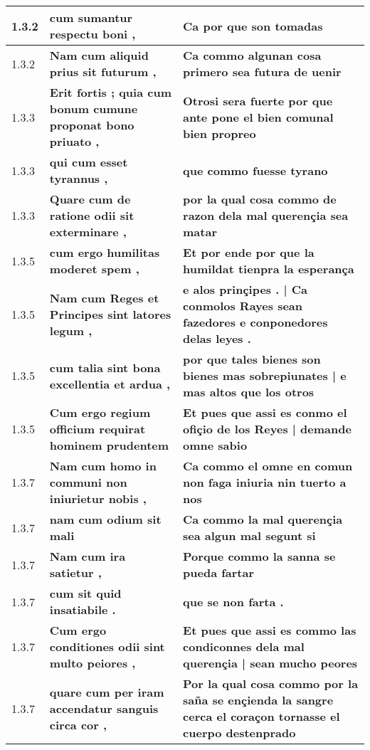 \begin{tabular}{|p{1cm}|p{6.5cm}|p{6.5cm}|}
1.3.2 &  \textbf{ cum sumantur respectu boni , }  &  \textbf{ Ca por que son tomadas }  \\\hline
1.3.2 &  \textbf{ Nam cum aliquid prius sit futurum , }  &  \textbf{ Ca commo algunan cosa primero sea futura de uenir }  \\\hline
1.3.3 &  \textbf{ Erit fortis ; quia cum bonum cumune proponat bono priuato , }  &  \textbf{ Otrosi sera fuerte por que ante pone el bien comunal bien propreo }  \\\hline
1.3.3 &  \textbf{ qui cum esset tyrannus , }  &  \textbf{ que commo fuesse tyrano }  \\\hline
1.3.3 &  \textbf{ Quare cum de ratione odii sit exterminare , }  &  \textbf{ por la qual cosa commo de razon dela mal querençia sea matar }  \\\hline
1.3.5 &  \textbf{ cum ergo humilitas moderet spem , }  &  \textbf{ Et por ende por que la humildat tienpra la esperança }  \\\hline
1.3.5 &  \textbf{ Nam cum Reges et Principes sint latores legum , }  &  \textbf{ e alos prinçipes . | Ca conmolos Rayes sean fazedores e conponedores delas leyes . }  \\\hline
1.3.5 &  \textbf{ cum talia sint bona excellentia et ardua , }  &  \textbf{ por que tales bienes son bienes mas sobrepiunates | e mas altos que los otros }  \\\hline
1.3.5 &  \textbf{ Cum ergo regium officium requirat hominem prudentem }  &  \textbf{ Et pues que assi es conmo el ofiçio de los Reyes | demande omne sabio }  \\\hline
1.3.7 &  \textbf{ Nam cum homo in communi non iniurietur nobis , }  &  \textbf{ Ca commo el omne en comun non faga iniuria nin tuerto a nos }  \\\hline
1.3.7 &  \textbf{ nam cum odium sit mali }  &  \textbf{ Ca commo la mal querençia sea algun mal segunt si }  \\\hline
1.3.7 &  \textbf{ Nam cum ira satietur , }  &  \textbf{ Porque commo la sanna se pueda fartar }  \\\hline
1.3.7 &  \textbf{ cum sit quid insatiabile . }  &  \textbf{ que se non farta . }  \\\hline
1.3.7 &  \textbf{ Cum ergo conditiones odii sint multo peiores , }  &  \textbf{ Et pues que assi es commo las condiconnes dela mal querençia | sean mucho peores }  \\\hline
1.3.7 &  \textbf{ quare cum per iram accendatur sanguis circa cor , }  &  \textbf{ Por la qual cosa commo por la saña se ençienda la sangre cerca el coraçon tornasse el cuerpo destenprado }  \\\hline

\end{tabular}

